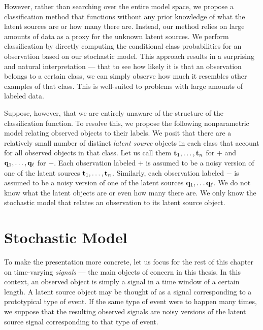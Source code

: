 
However, rather than searching over the entire model space, we propose a
classification method that functions without any prior knowledge of what the
latent sources are or how many there are. Instead, our method relies on large
amounts of data as a proxy for the unknown latent sources. We perform
classification by directly computing the conditional class probabilities for an
observation based on our stochastic model. This approach results in a surprising
and natural interpretation --- that to see how likely it is that an observation
belongs to a certain class, we can simply observe how much it resembles other
examples of that class. This is well-suited to problems with large amounts of
labeled data.


Suppose, however, that we are entirely unaware of the structure of the
classification function. To resolve this, we propose the following nonparametric
model relating observed objects to their labels. We posit that there are a
relatively small number of distinct {\em latent source} objects in each class
that account for all observed objects in that class. Let us call them $\mathbf t_1,
\dots, \mathbf t_n$ for $+$ and $\mathbf q_1, \dots, \mathbf q_{\ell}$ for $-$. Each
observation labeled $+$ is assumed to be a noisy version of one of the latent
sources $\mathbf t_1, \dots, \mathbf t_n$. Similarly, each observation labeled $-$ is
assumed to be a noisy version of one of the latent sources $\mathbf q_1, \dots \mathbf
q_{\ell}$. We do not know what the latent objects are or even how many there
are. We only know the stochastic model that relates an observation to its latent
source object.

\section{Stochastic Model}
To make the presentation more concrete, let us focus for the rest of this
chapter on time-varying {\em signals} --- the main objects of concern in this
thesis. In this context, an observed object is simply a signal in a time window
of a certain length.  A latent source object may be thought of as a signal
corresponding to a prototypical type of event. If the same type of event were to
happen many times, we suppose that the resulting observed signals are noisy
versions of the latent source signal corresponding to that type of event.

